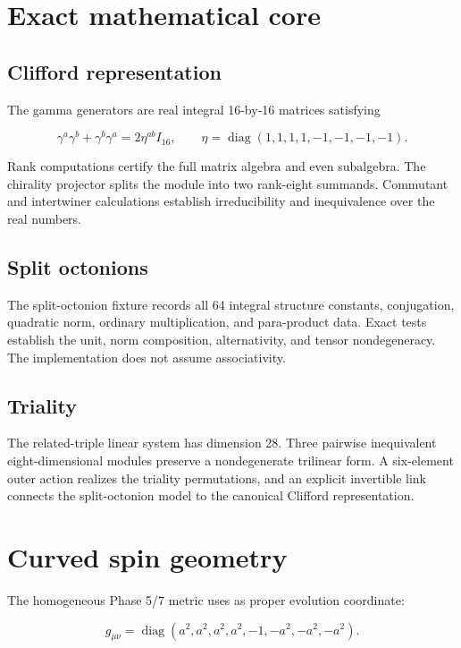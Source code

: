 \documentclass[11pt]{article}
\begin{document}
\section{Exact mathematical core}

\subsection{Clifford representation}

The gamma generators are real integral 16-by-16 matrices satisfying

\[
\gamma^a\gamma^b+\gamma^b\gamma^a=2\eta^{ab}I_{16},
\qquad
\eta=\operatorname{diag}(1,1,1,1,-1,-1,-1,-1).
\]

Rank computations certify the full matrix algebra and even subalgebra. The chirality projector splits the module into two rank-eight summands. Commutant and intertwiner calculations establish irreducibility and inequivalence over the real numbers.

\subsection{Split octonions}

The split-octonion fixture records all 64 integral structure constants, conjugation, quadratic norm, ordinary multiplication, and para-product data. Exact tests establish the unit, norm composition, alternativity, and tensor nondegeneracy. The implementation does not assume associativity.

\subsection{Triality}

The related-triple linear system has dimension 28. Three pairwise inequivalent eight-dimensional modules preserve a nondegenerate trilinear form. A six-element outer action realizes the triality permutations, and an explicit invertible link connects the split-octonion model to the canonical Clifford representation.

\section{Curved spin geometry}

The homogeneous Phase 5/7 metric uses \texttt{} as proper evolution coordinate:

\[
g_{\mu\nu}=\operatorname{diag}
(a^2,a^2,a^2,a^2,-1,-a^2,-a^2,-a^2).
\]
\end{document}

